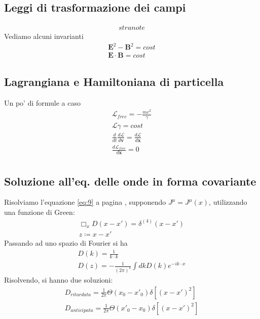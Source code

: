 \documentclass[a4paper, twocolumn]{article}
\begin{document}
\subsection{Leggi di trasformazione dei campi}
\label{sec:leggi-di-trasf}

\begin{align}
  \label{eq:14}
  stranote
\end{align}
Vediamo alcuni invarianti
\begin{align}
  \label{eq:15}
  \mathbf{E}^2-\mathbf{B}^2=cost \\
  \mathbf{E}\cdot\mathbf{B}=cost
\end{align}

\subsection{Lagrangiana e Hamiltoniana di particella}
\label{sec:lagr-e-hamilt}
Un po' di formule a caso
\begin{align}
  \label{eq:16}
  \mathcal{L}_{free}=-\frac{mc^2}{\gamma} \\
  \mathcal{L}\gamma=cost \\
  \frac{d}{dt}\frac{d\mathcal{L}}{d\mathbf{v}}=\frac{d\mathcal{L}}{d\mathbf{x}} \\
  \frac{d\mathcal{L}_{free}}{d\mathbf{x}}=0 \\
\end{align}

\subsection{Soluzione all'eq. delle onde in forma covariante}
\label{sec:soluz-alleq-delle}
Risolviamo l'equazione \ref{eq:9} a pagina \pageref{eq:9}, supponendo $J^\mu=J^\mu(x)$, utilizzando una funzione di Green:
\begin{align}
  \label{eq:18}
  \Box_x D(x-x')=\delta^{(4)}(x-x') \\
  z\coloneqq x-x'
\end{align}
Passando ad uno spazio di Fourier si ha
\begin{align}
  \label{eq:19}
  D(k)=\frac{1}{k\cdot k} \\
  D(z)=-\frac{1}{(2\pi)^4}\int dk D(k) e^{-ik\cdot x}
\end{align}
Risolvendo, si hanno due soluzioni:
\begin{align}
  \label{eq:20}
  D_{ritardata}=\frac{1}{2\pi}\Theta(x_0-x'_0)\delta[(x-x')^2] \\
  D_{anticipata}=\frac{1}{2\pi}\Theta(x'_0-x_0)\delta[(x-x')^2] 
\end{align}
\end{document}
